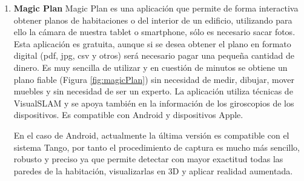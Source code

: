 \begin {enumerate}
\begin{figure}[htbp]
\begin{center}
\hspace{0.5cm}
\end{center}
\caption{Generación de mapa 1 (d). Generación de mapa 2 (e)}
\end{figure}

\clearpage

\item \textbf{Magic Plan}
Magic Plan es una aplicación que permite de forma interactiva obtener planos de habitaciones o del interior de un edificio, utilizando para ello la cámara de nuestra tablet o smartphone, sólo es necesario sacar fotos. Esta aplicación es gratuita, aunque si se desea obtener el plano en formato digital (pdf, jpg, csv y otros) será necesario pagar una pequeña cantidad de dinero.
Es muy sencilla de utilizar y en cuestión de minutos se obtiene un plano fiable (Figura \ref{fig:magicPlan}) sin necesidad de medir, dibujar, mover muebles  y sin necesidad de ser un experto.
La aplicación utiliza técnicas de VisualSLAM y se apoya también en la información de los giroscopios de los dispositivos. Es compatible con Android y dispositivos Apple.

En el caso de Android, actualmente la última versión es compatible con el sistema Tango, por tanto el procedimiento de captura es mucho más sencillo, robusto y preciso  ya que  permite detectar con mayor exactitud todas las paredes de la habitación, visualizarlas en 3D y aplicar realidad aumentada.


\end{enumerate}

